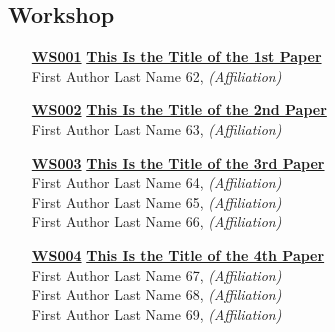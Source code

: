 \subsection{Workshop}
\begin{enumerate}
\item[\href{https://doi.org/10.1145/1122445.1122456}{\textbf{WS001}}]
\href{https://doi.org/10.1145/1122445.1122456}{\textbf{This Is the Title of the 1st Paper}}\\
First Author Last Name 62, \emph{(Affiliation)}\\

\item[\href{https://doi.org/10.1145/1122445.1122456}{\textbf{WS002}}]
\href{https://doi.org/10.1145/1122445.1122456}{\textbf{This Is the Title of the 2nd Paper}}\\
First Author Last Name 63, \emph{(Affiliation)}\\

\item[\href{https://doi.org/10.1145/1122445.1122456}{\textbf{WS003}}]
\href{https://doi.org/10.1145/1122445.1122456}{\textbf{This Is the Title of the 3rd Paper}}\\
First Author Last Name 64, \emph{(Affiliation)}\\
First Author Last Name 65, \emph{(Affiliation)}\\
First Author Last Name 66, \emph{(Affiliation)}\\

\item[\href{https://doi.org/10.1145/1122445.1122456}{\textbf{WS004}}]
\href{https://doi.org/10.1145/1122445.1122456}{\textbf{This Is the Title of the 4th Paper}}\\
First Author Last Name 67, \emph{(Affiliation)}\\
First Author Last Name 68, \emph{(Affiliation)}\\
First Author Last Name 69, \emph{(Affiliation)}\\
\end{enumerate}

